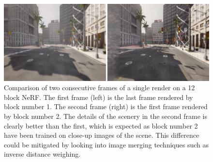 \begin{figure}[!h]
    \centering
    \includegraphics[width=1.0\textwidth]{figures/block-nerf-frame-comparison.png}
    \caption{Comparison of two consecutive frames of a single render on a 12 block NeRF. The first frame (left) is the last frame rendered by block number 1. The second frame (right) is the first frame rendered by block number 2. The details of the scenery in the second frame is clearly better than the first, which is expected as block number 2 have been trained on close-up images of the scene. This difference could be mitigated by looking into image merging techniques such as inverse distance weighing.}
    \label{fig:block-nerf-frame-comparison}
\end{figure}